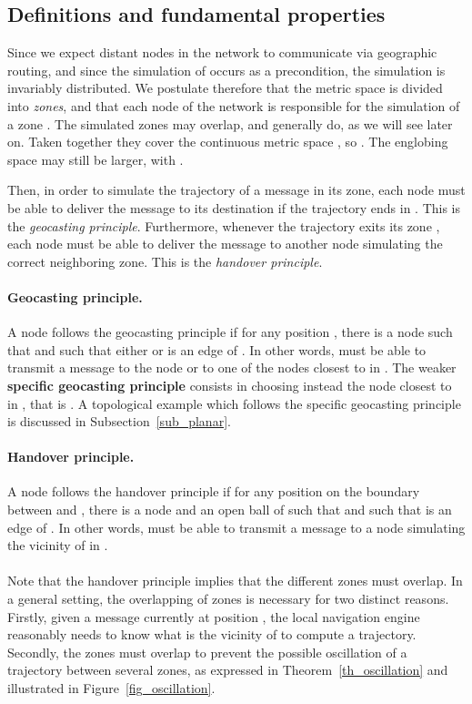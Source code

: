\documentclass{article}
\begin{document}
\subsection{Definitions and fundamental properties}
\label{sub_def}
Since we expect distant nodes in the network to communicate via geographic routing, and since the simulation of  occurs as a precondition, the simulation is invariably distributed. We postulate therefore that the metric space  is divided into {\em zones}, and that each node  of the network is responsible for the simulation of a zone . The simulated zones may overlap, and generally do, as we will see later on. Taken together they cover the continuous metric space , so . The englobing space  may still be larger, with .

Then, in order to simulate the trajectory  of a message in its zone, each node  must be able to deliver the message to its destination if the trajectory ends in . This is the {\em geocasting principle}. Furthermore, whenever the trajectory exits its zone , each node  must be able to deliver the message to another node simulating the correct neighboring zone. This is the {\em handover principle}.

\paragraph{Geocasting principle.} A node  follows the geocasting principle if for any position , there is a node  such that  and such that either  or  is an edge of . In other words,  must be able to transmit a message to the node or to one of the nodes closest to  in . The weaker {\bf specific geocasting principle} consists in choosing instead the node closest to  in , that is . A topological example which follows the specific geocasting principle is discussed in Subsection~\ref{sub_planar}.

\paragraph{Handover principle.} A node  follows the handover principle if for any position  on the boundary between  and , there is a node  and an open ball  of  such that  and such that  is an edge of .
In other words,  must be able to transmit a message to a node simulating the vicinity of  in .

\paragraph{}
Note that the handover principle implies that the different zones must overlap. In a general setting, the overlapping of zones is necessary for two distinct reasons. Firstly, given a message currently at position , the local navigation engine reasonably needs to know what is the vicinity of  to compute a trajectory. Secondly, the zones must overlap to prevent the possible oscillation of a trajectory between several zones, as expressed in Theorem~\ref{th_oscillation} and illustrated in Figure~\ref{fig_oscillation}.
\end{document}
